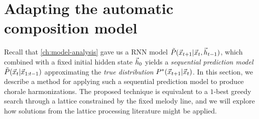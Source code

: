 

\section{Adapting the automatic composition model}


Recall that \cref{ch:model-analysis} gave us a RNN model
$\tilde{P}(\vec{x}_{t+1} | \vec{x}_{t}, \vec{h}_{t-1})$, which combined with a fixed
initial hidden state $\vec{h}_0$ yields a \emph{sequential prediction model}
$\tilde{P}(\vec{x}_t | \vec{x}_{1:t-1})$ approximating the \emph{true distribution}
$P^*(\vec{x}_{t+1} | \vec{x}_{t})$. In this section, we describe a method for applying
such a sequential prediction model to produce chorale harmonizations. The
proposed technique is equivalent to a $1$-best greedy search through a lattice
constrained by the fixed melody line, and we will explore how solutions from
the lattice processing literature might be applied.

